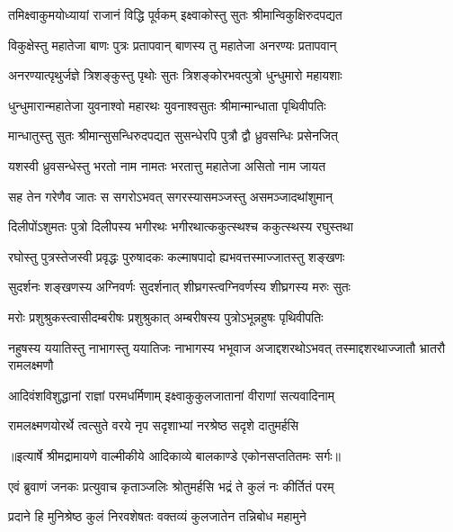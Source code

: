 \twolineshloka
{तमिक्ष्वाकुमयोध्यायां राजानं विद्धि पूर्वकम्}
{इक्ष्वाकोस्तु सुतः श्रीमान्विकुक्षिरुदपद्यत} %

\twolineshloka
{विकुक्षेस्तु महातेजा बाणः पुत्रः प्रतापवान्}
{बाणस्य तु महातेजा अनरण्यः प्रतापवान्} %

\twolineshloka
{अनरण्यात्पृथुर्जज्ञे त्रिशङ्कुस्तु पृथोः सुतः}
{त्रिशङ्कोरभवत्पुत्रो धुन्धुमारो महायशाः} %

\twolineshloka
{धुन्धुमारान्महातेजा युवनाश्वो महारथः}
{युवनाश्वसुतः श्रीमान्मान्धाता पृथिवीपतिः} %

\twolineshloka
{मान्धातुस्तु सुतः श्रीमान्सुसन्धिरुदपद्यत}
{सुसन्धेरपि पुत्रौ द्वौ ध्रुवसन्धिः प्रसेनजित्} %

\twolineshloka
{यशस्वी ध्रुवसन्धेस्तु भरतो नाम नामतः}
{भरतात्तु महातेजा असितो नाम जायत} %

\twolineshloka
{सह तेन गरेणैव जातः स सगरोऽभवत्}
{सगरस्यासमञ्जस्तु असमञ्जादथांशुमान्} %

\twolineshloka
{दिलीपोंऽशुमतः पुत्रो दिलीपस्य भगीरथः}
{भगीरथात्ककुत्स्थश्च ककुत्स्थस्य रघुस्तथा} %

\twolineshloka
{रघोस्तु पुत्रस्तेजस्वी प्रवृद्धः पुरुषादकः}
{कल्माषपादो ह्यभवत्तस्माज्जातस्तु शङ्खणः} %

\twolineshloka
{सुदर्शनः शङ्खणस्य अग्निवर्णः सुदर्शनात्}
{शीघ्रगस्त्वग्निवर्णस्य शीघ्रगस्य मरुः सुतः} %

\twolineshloka
{मरोः प्रशुश्रुकस्त्वासीदम्बरीषः प्रशुश्रुकात्}
{अम्बरीषस्य पुत्रोऽभून्नहुषः पृथिवीपतिः} %

\threelineshloka
{नहुषस्य ययातिस्तु नाभागस्तु ययातिजः}
{नाभागस्य भभूवाज अजाद्दशरथोऽभवत्}
{तस्माद्दशरथाज्जातौ भ्रातरौ रामलक्ष्मणौ} %

\twolineshloka
{आदिवंशविशुद्धानां राज्ञां परमधर्मिणाम्}
{इक्ष्वाकुकुलजातानां वीराणां सत्यवादिनाम्} %

\twolineshloka
{रामलक्ष्मणयोरर्थे त्वत्सुते वरये नृप}
{सदृशाभ्यां नरश्रेष्ठ सदृशे दातुमर्हसि} %


{॥इत्यार्षे श्रीमद्रामायणे वाल्मीकीये आदिकाव्ये बालकाण्डे एकोनसप्ततितमः सर्गः॥}


\twolineshloka
{एवं ब्रुवाणं जनकः प्रत्युवाच कृताञ्जलिः}
{श्रोतुमर्हसि भद्रं ते कुलं नः कीर्तितं परम्} %

\twolineshloka
{प्रदाने हि मुनिश्रेष्ठ कुलं निरवशेषतः}
{वक्तव्यं कुलजातेन तन्निबोध महामुने} %

